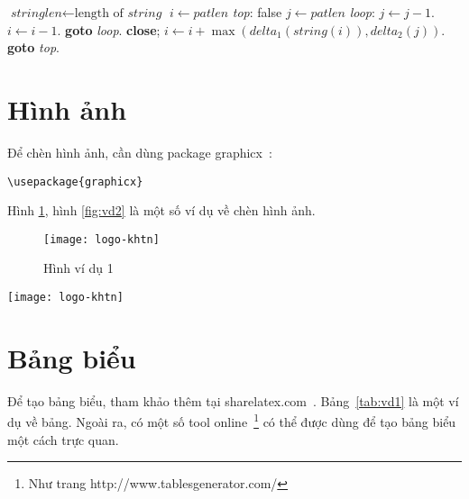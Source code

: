 \begin{algorithm}
\caption{My algorithm}\label{euclid}
\begin{algorithmic}[1]
\State $\textit{stringlen} \gets \text{length of }\textit{string}$
\State $i \gets \textit{patlen}$
\BState \emph{top}:
 \Return false
\EndIf
\State $j \gets \textit{patlen}$
\BState \emph{loop}:
\State $j \gets j-1$.
\State $i \gets i-1$.
\State \textbf{goto} \emph{loop}.
\State \textbf{close};
\EndIf
\State $i \gets i+\max(\textit{delta}_1(\textit{string}(i)),\textit{delta}_2(j))$.
\State \textbf{goto} \emph{top}.
\EndProcedure
\end{algorithmic}
\end{algorithm}

\section{Hình ảnh}

Để chèn hình ảnh, cần dùng package graphicx~\cite{Figures}:

\begin{lstlisting}
\usepackage{graphicx}
\end{lstlisting}

Hình \ref{fig:vd1}, hình \ref{fig:vd2} là một số ví dụ về chèn hình ảnh.

\begin{figure}[htp]
\centering
\texttt{[image: logo-khtn]}
\caption{Hình ví dụ 1}
\label{fig:vd1}
\end{figure}

\begin{figure*}[htp]
\centering
\texttt{[image: logo-khtn]}
\caption{Hình ví dụ 2}
\label{fig:vd2}
\end{figure*}

\section{Bảng biểu}

Để tạo bảng biểu, tham khảo thêm tại sharelatex.com~\cite{Tables}.
Bảng~\ref{tab:vd1} là một ví dụ về bảng.
Ngoài ra, có một số tool online~\footnote{Như trang http://www.tablesgenerator.com/} có thể được dùng để tạo bảng biểu một cách trực quan.

